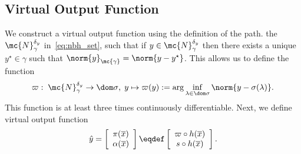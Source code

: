 \subsection{Virtual Output Function}
We construct a virtual output function using the definition of the path.  the \nbhd $\mc{N}_\gamma^{\by}$ in~\eqref{eq:nbh_set},  such that if $y \in \mc{N}_{\gamma}^{\by}$ then there exists a unique $y^\star \in \gamma$ such
that $\norm{y}_\mc{\pn{\gamma}} = \norm{y - y^\star}$. This allows us to define the
function
\begin{equation}
\varpi : \; \mc{N}_{\gamma}^{\by} \rightarrow \nw{\dom \sigma},\; y \mapsto \varpi(y) :=\arg
\inf_{\lambda \in \nw{\dom \sigma}}\norm{y - \sigma(\lambda)}.
\label{eq:proj}
\end{equation}
This function is at least three times continuously differentiable. Next, we define  virtual output function
%
%
\begin{equation}\label{eq:virtual}
\begin{aligned}
\hat{y} = \left[\begin{array}{c}\pi(\agx)\\\alpha(\agx) \end{array}\right] \eqdef
\left[\begin{array}{c}\varpi \circ h (\agx)\\s \circ h(\agx)\end{array}\right].
\end{aligned}
\end{equation}
